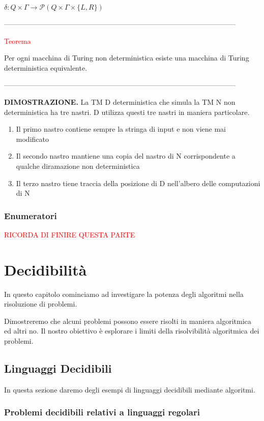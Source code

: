 \documentclass{article}
\begin{document}
\begin{center}
    $\delta: Q \times \Gamma \rightarrow \mathcal{P}(Q \times \Gamma \times \{L,
    R\})$
\end{center}

--------------------------------------------------------------------------------------------------

\begin{center}
    \textcolor{red}{Teorema}
\end{center}

Per ogni macchina di Turing non deterministica esiste una macchina di Turing
deterministica equivalente.

--------------------------------------------------------------------------------------------------

\textbf{DIMOSTRAZIONE.}  La TM D deterministica che simula la TM N non
deterministica ha tre nastri. D utilizza questi tre nastri in maniera
particolare.

\begin{enumerate}
    \item Il primo nastro contiene sempre la stringa di input e non viene mai
    modificato
    \item Il secondo nastro mantiene una copia del nastro di N corrispondente a
    qualche diramazione non deterministica
    \item Il terzo nastro tiene traccia della posizione di D nell'albero delle
    computazioni di N
\end{enumerate}

\subsubsection{Enumeratori}

\textcolor{red}{RICORDA DI FINIRE QUESTA PARTE}

\section{Decidibilità}

In questo capitolo cominciamo ad investigare la potenza degli algoritmi nella
risoluzione di problemi.

Dimostreremo che alcuni problemi possono essere risolti in maniera algoritmica
ed altri no. Il nostro obiettivo è esplorare i limiti della risolvibilità
algoritmica dei problemi. 

\subsection{Linguaggi Decidibili}

In questa sezione daremo degli esempi di linguaggi decidibili mediante algoritmi.

\subsubsection{Problemi decidibili relativi a linguaggi regolari}
\end{document}
